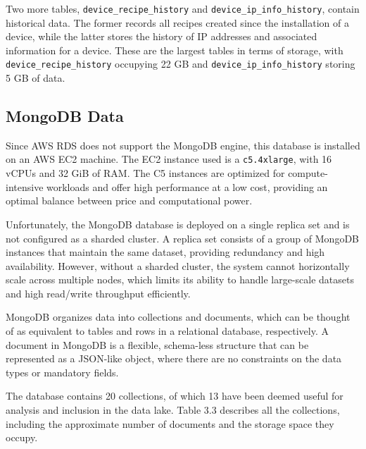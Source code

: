 Two more tables, \texttt{device\_recipe\_history} and \texttt{device\_ip\_info\_history}, contain historical data. The former records all recipes created since the installation of a device, while the latter stores the history of IP addresses and associated information for a device. These are the largest tables in terms of storage, with \texttt{device\_recipe\_history} occupying 22 GB and \texttt{device\_ip\_info\_history} storing 5 GB of data.

\subsection{MongoDB Data}
Since \ac{AWS} RDS does not support the MongoDB engine, this database is installed on an \ac{AWS} \ac{EC2} machine. The \ac{EC2} instance used is a \texttt{c5.4xlarge}, with 16 vCPUs and 32 GiB of RAM. The C5 instances are optimized for compute-intensive workloads and offer high performance at a low cost, providing an optimal balance between price and computational power.

Unfortunately, the MongoDB database is deployed on a single replica set and is not configured as a sharded cluster. A replica set consists of a group of MongoDB instances that maintain the same dataset, providing redundancy and high availability. However, without a sharded cluster, the system cannot horizontally scale across multiple nodes, which limits its ability to handle large-scale datasets and high read/write throughput efficiently.

MongoDB organizes data into collections and documents, which can be thought of as equivalent to tables and rows in a relational database, respectively. A document in MongoDB is a flexible, schema-less structure that can be represented as a \ac{JSON}-like object, where there are no constraints on the data types or mandatory fields.

The database contains 20 collections, of which 13 have been deemed useful for analysis and inclusion in the data lake. Table 3.3 describes all the collections, including the approximate number of documents and the storage space they occupy.

